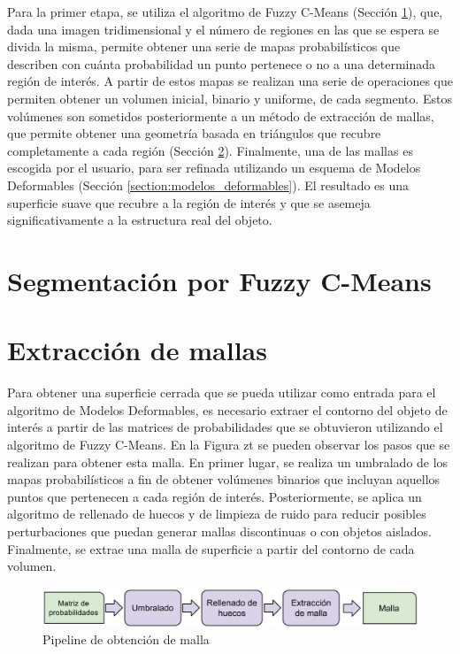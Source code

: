 Para la primer etapa, se utiliza el algoritmo de Fuzzy C-Means (Sección \ref{section:segmentacion_fuzzy}), que, dada una imagen tridimensional y el número de regiones en las que se espera se divida la misma, permite obtener una serie de mapas probabilísticos que describen con cuánta probabilidad un punto pertenece o no a una determinada región de interés. A partir de estos mapas se realizan una serie de operaciones que permiten obtener un volumen inicial, binario y uniforme, de cada segmento. Estos volúmenes son sometidos posteriormente a un método de extracción de mallas, que permite obtener una geometría basada en triángulos que recubre completamente a cada región (Sección \ref{section:extraccion_de_mallas}). Finalmente, una de las mallas es escogida por el usuario, para ser refinada utilizando un esquema de Modelos Deformables (Sección \ref{section:modelos_deformables}). El resultado es una superficie suave que recubre a la región de interés y que se asemeja significativamente a la estructura real del objeto.

\section{Segmentación por Fuzzy C-Means}\label{section:segmentacion_fuzzy}

\section{Extracción de mallas}\label{section:extraccion_de_mallas}
Para obtener una superficie cerrada que se pueda utilizar como entrada para el algoritmo de Modelos Deformables, es necesario extraer el contorno del objeto de interés a partir de las matrices de probabilidades que se obtuvieron utilizando el algoritmo de Fuzzy C-Means. En la Figura zt se pueden observar los pasos que se realizan para obtener esta malla. En primer lugar, se realiza un umbralado de los mapas probabilísticos a fin de obtener volúmenes binarios que incluyan aquellos puntos que pertenecen a cada región de interés. Posteriormente, se aplica un algoritmo de rellenado de huecos y de limpieza de ruido para reducir posibles perturbaciones que puedan generar mallas discontinuas o con objetos aislados. Finalmente, se extrae una malla de superficie a partir del contorno de cada volumen.

\begin{figure}[H]
	\centering
	\includegraphics[scale=0.3]{images/pipeline_de_obtencion_de_malla.jpg}
	\caption{Pipeline de obtención de malla}
	\label{fig:pipe_obtencion_malla}
\end{figure}


